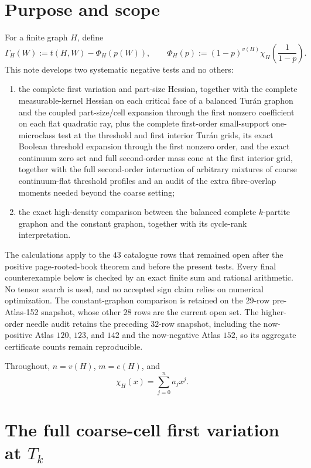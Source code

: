 \documentclass[11pt]{article}
\begin{document}
\section{Purpose and scope}

For a finite graph $H$, define
\[
 \Gamma_H(W):=t(H,W)-\Phi_H(p(W)),
 \qquad
 \Phi_H(p):=(1-p)^{v(H)}
 \chi_H\!\left(\frac1{1-p}\right).
\]
This note develops two systematic negative tests and no others:
\begin{enumerate}
 \item the complete first variation and part-size Hessian, together with the
 complete measurable-kernel Hessian on each critical face of a balanced
 Tur\'an graphon and the coupled part-size/cell expansion through the first
 nonzero coefficient on each flat quadratic ray, plus the complete
 first-order small-support one-microclass test at the threshold and first
 interior Tur\'an grids, its exact Boolean threshold expansion through the
 first nonzero order, and the exact continuum zero set and full
 second-order mass cone at the first interior grid, together with the full
 second-order interaction of arbitrary mixtures of coarse continuum-flat
 threshold profiles and an audit of the extra fibre-overlap moments needed
 beyond the coarse setting;
 \item the exact high-density comparison between the balanced complete
 $k$-partite graphon and the constant graphon, together with its
 cycle-rank interpretation.
\end{enumerate}
The calculations apply to the $43$ catalogue rows that remained open after
the positive page-rooted-book theorem and before the present tests.  Every
final counterexample below is checked by an exact finite sum and rational
arithmetic.  No tensor search is used, and no accepted sign claim relies on
numerical optimization.  The constant-graphon comparison is retained on the
29-row pre-Atlas-152 snapshot, whose other $28$ rows are the current open
set.  The higher-order needle audit retains the preceding $32$-row snapshot,
including the now-positive Atlas $120$, $123$, and $142$ and the now-negative
Atlas $152$, so its aggregate certificate counts remain reproducible.

Throughout, $n=v(H)$, $m=e(H)$, and
\[
 \chi_H(x)=\sum_{j=0}^n a_jx^j.
\]


\section{The full coarse-cell first variation at $T_k$}
\end{document}
